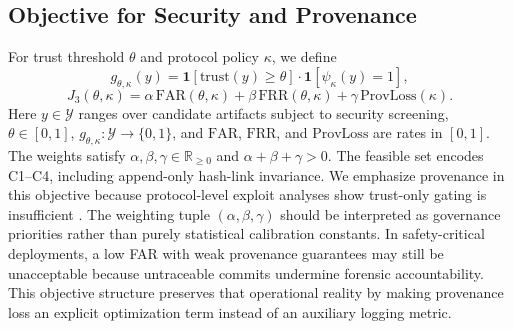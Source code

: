\documentclass{article} %
\begin{document}
\subsection{Objective for Security and Provenance}
For trust threshold $\theta$ and protocol policy $\kappa$, we define
\begin{equation}
g_{\theta,\kappa}(y)=\mathbf{1}[\mathrm{trust}(y)\ge\theta]\cdot\mathbf{1}[\psi_{\kappa}(y)=1],
\label{eq:guard}
\end{equation}
\begin{equation}
J_3(\theta,\kappa)=\alpha\,\mathrm{FAR}(\theta,\kappa)+\beta\,\mathrm{FRR}(\theta,\kappa)+\gamma\,\mathrm{ProvLoss}(\kappa).
\label{eq:objective_j3}
\end{equation}
Here $y\in\mathcal{Y}$ ranges over candidate artifacts subject to security screening, $\theta\in[0,1]$, $g_{\theta,\kappa}:\mathcal{Y}\to\{0,1\}$, and $\mathrm{FAR}$, $\mathrm{FRR}$, and $\mathrm{ProvLoss}$ are rates in $[0,1]$. The weights satisfy $\alpha,\beta,\gamma\in\mathbb{R}_{\ge0}$ and $\alpha+\beta+\gamma>0$. The feasible set encodes C1--C4, including append-only hash-link invariance. We emphasize provenance in this objective because protocol-level exploit analyses show trust-only gating is insufficient \citep{ferrag2026,ismail2025,gao2025}.
The weighting tuple $(\alpha,\beta,\gamma)$ should be interpreted as governance priorities rather than purely statistical calibration constants. In safety-critical deployments, a low FAR with weak provenance guarantees may still be unacceptable because untraceable commits undermine forensic accountability. This objective structure preserves that operational reality by making provenance loss an explicit optimization term instead of an auxiliary logging metric.
\end{document}
